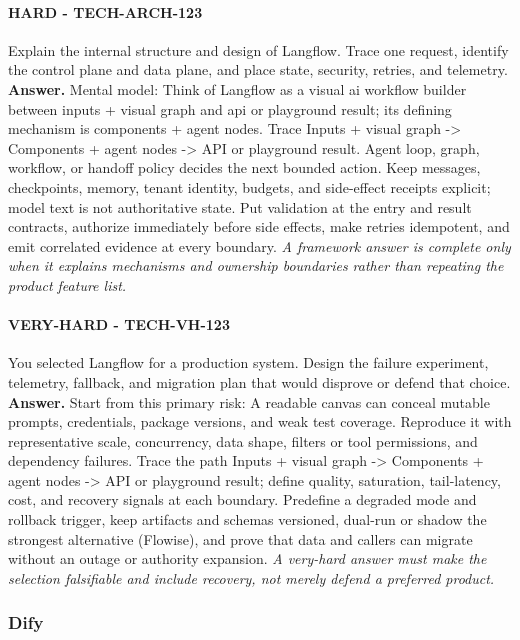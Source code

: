 \paragraph{HARD - TECH-ARCH-123} Explain the internal structure and design of Langflow. Trace one request, identify the control plane and data plane, and place state, security, retries, and telemetry.
\textbf{Answer.} Mental model: Think of Langflow as a visual ai workflow builder between inputs + visual graph and api or playground result; its defining mechanism is components + agent nodes. Trace Inputs + visual graph -> Components + agent nodes -> API or playground result. Agent loop, graph, workflow, or handoff policy decides the next bounded action. Keep messages, checkpoints, memory, tenant identity, budgets, and side-effect receipts explicit; model text is not authoritative state. Put validation at the entry and result contracts, authorize immediately before side effects, make retries idempotent, and emit correlated evidence at every boundary.
\textit{A framework answer is complete only when it explains mechanisms and ownership boundaries rather than repeating the product feature list.}
\paragraph{VERY-HARD - TECH-VH-123} You selected Langflow for a production system. Design the failure experiment, telemetry, fallback, and migration plan that would disprove or defend that choice.
\textbf{Answer.} Start from this primary risk: A readable canvas can conceal mutable prompts, credentials, package versions, and weak test coverage. Reproduce it with representative scale, concurrency, data shape, filters or tool permissions, and dependency failures. Trace the path Inputs + visual graph -> Components + agent nodes -> API or playground result; define quality, saturation, tail-latency, cost, and recovery signals at each boundary. Predefine a degraded mode and rollback trigger, keep artifacts and schemas versioned, dual-run or shadow the strongest alternative (Flowise), and prove that data and callers can migrate without an outage or authority expansion.
\textit{A very-hard answer must make the selection falsifiable and include recovery, not merely defend a preferred product.}
\subsubsection*{Dify}
